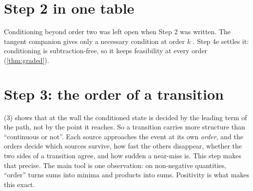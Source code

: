 \documentclass[11pt]{article}
\theoremstyle{definition}\newtheorem{definition}[theorem]{Definition}\newtheorem{remark}[theorem]{Remark}\newtheorem{example}[theorem]{Example}
\begin{document}
\section{Step 2 in one table}\label{sec:step2table}
\begin{center}\small
{}
\end{center}
Conditioning beyond order two was left open when Step 2 was written. The tangent companion gives only a necessary condition at order $k$
\cite[Proposition ``order $k$: necessity, and order three'']{TangentCompanion}. Step 4e settles it: conditioning is subtraction-free, so it keeps
feasibility at every order (\cref{thm:graded}).

\section{Step 3: the order of a transition}\label{sec:orders}
(3) shows that at the wall the conditioned state is decided by the leading term of the path, not by the point it reaches.
So a transition carries more structure than ``continuous or not''. Each source approaches the event at its own \emph{order}, and the orders
decide which sources survive, how fast the others disappear, whether the two sides of a transition agree, and how sudden a near-miss is.
This step makes that precise. The main tool is one observation: on non-negative quantities, ``order'' turns sums into minima and products
into sums. Positivity is what makes this exact.
\end{document}
